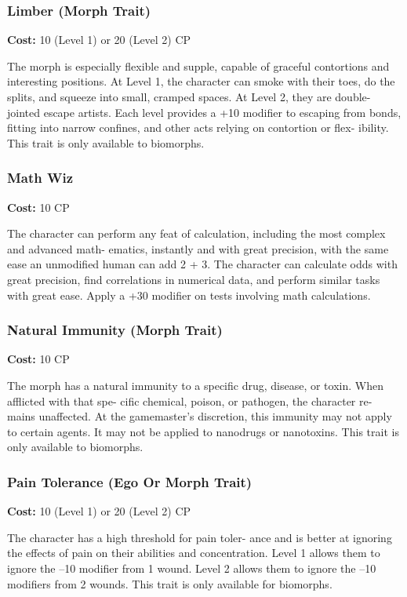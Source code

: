 \subsubsection{Limber (Morph Trait)}

\textbf{Cost:} 10 (Level 1) or 20 (Level 2) CP

The morph is especially flexible and supple, capable of 
graceful contortions and interesting positions. At Level 
1, the character can smoke with their toes, do the splits, 
and squeeze into small, cramped spaces. At Level 2, they 
are double-jointed escape artists. Each level provides a 
+10 modifier to escaping from bonds, fitting into narrow 
confines, and other acts relying on contortion or flex-
ibility. This trait is only available to biomorphs.

\subsubsection{Math Wiz}

\textbf{Cost:} 10 CP

The character can perform any feat of calculation, 
including the most complex and advanced math-
ematics, instantly and with great precision, with the 
same ease an unmodified human can add 2 + 3. The 
character can calculate odds with great precision, find 
correlations in numerical data, and perform similar 
tasks with great ease. Apply a +30 modifier on tests 
involving math calculations.

\subsubsection{Natural Immunity (Morph Trait)}

\textbf{Cost:} 10 CP

The morph has a natural immunity to a specific 
drug, disease, or toxin. When afflicted with that spe-
cific chemical, poison, or pathogen, the character re-
mains unaffected. At the gamemaster's discretion, this 
immunity may not apply to certain agents. It may not 
be applied to nanodrugs or nanotoxins. This trait is 
only available to biomorphs.

\subsubsection{Pain Tolerance (Ego Or Morph Trait)}

\textbf{Cost:} 10 (Level 1) or 20 (Level 2) CP

The character has a high threshold for pain toler-
ance and is better at ignoring the effects of pain on 
their abilities and concentration. Level 1 allows them 
to ignore the –10 modifier from 1 wound. Level 2
allows them to ignore the –10 modifiers from 2 
wounds. This trait is only available for biomorphs.

